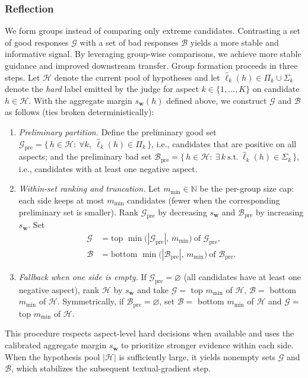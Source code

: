 \documentclass[letterpaper]{article} %
\begin{document}
\subsubsection{Reflection}
We form groups instead of comparing only extreme candidates. Contrasting a set of good responses \(\mathcal{G}\) with a set of bad responses \(\mathcal{B}\) yields a more stable and informative signal. By leveraging group-wise comparisons, we achieve more stable guidance and improved downstream transfer.
Group formation proceeds in three steps. Let \(\mathcal{H}\) denote the current pool of hypotheses and let \(\hat\ell_k(h)\in \Pi_k\cup\Sigma_k\) denote the \emph{hard} label emitted by the judge for aspect \(k\in\{1,\dots,K\}\) on candidate \(h\in\mathcal{H}\). With the aggregate margin \(s_{\mathbf w}(h)\) defined above, we construct \(\mathcal{G}\) and \(\mathcal{B}\) as follows (ties broken deterministically):
\begin{enumerate}
  \item \emph{Preliminary partition.} Define the preliminary good set
  \(\mathcal{G}_{\text{pre}}=\{\,h\in\mathcal{H}:\ \forall k,\ \hat\ell_k(h)\in \Pi_k\,\}\),
  i.e., candidates that are positive on all aspects; and the preliminary bad set
  \(\mathcal{B}_{\text{pre}}=\{\,h\in\mathcal{H}:\ \exists\,k\ \text{s.t.}\ \hat\ell_k(h)\in \Sigma_k\,\}\),
  i.e., candidates with at least one negative aspect.
  \item \emph{Within-set ranking and truncation.} Let \(m_{\min}\in\mathbb{N}\) be the per-group size cap: each side keeps at most \(m_{\min}\) candidates (fewer when the corresponding preliminary set is smaller). Rank \(\mathcal{G}_{\text{pre}}\) by decreasing \(s_{\mathbf w}\) and \(\mathcal{B}_{\text{pre}}\) by increasing \(s_{\mathbf w}\). Set
  \[
  \begin{aligned}
    \mathcal{G} &= \text{top }\min\!\bigl(|\mathcal{G}_{\text{pre}}|,\,m_{\min}\bigr)\ \text{of }\mathcal{G}_{\text{pre}},\\
    \mathcal{B} &= \text{bottom }\min\!\bigl(|\mathcal{B}_{\text{pre}}|,\,m_{\min}\bigr)\ \text{of }\mathcal{B}_{\text{pre}}.
  \end{aligned}
  \]
  \item \emph{Fallback when one side is empty.} If \(\mathcal{G}_{\text{pre}}=\varnothing\) (all candidates have at least one negative aspect), rank \(\mathcal{H}\) by \(s_{\mathbf w}\) and take
  \(\mathcal{G}=\) top \(m_{\min}\) of \(\mathcal{H}\), \(\mathcal{B}=\) bottom \(m_{\min}\) of \(\mathcal{H}\).
  Symmetrically, if \(\mathcal{B}_{\text{pre}}=\varnothing\), set \(\mathcal{B}=\) bottom \(m_{\min}\) of \(\mathcal{H}\) and \(\mathcal{G}=\) top \(m_{\min}\) of \(\mathcal{H}\).
\end{enumerate}
This procedure respects aspect-level hard decisions when available and uses the calibrated aggregate margin \(s_{\mathbf w}\) to prioritize stronger evidence within each side. When the hypothesis pool $|\mathcal{H}|$ is sufficiently large, it yields nonempty sets $\mathcal{G}$ and $\mathcal{B}$, which stabilizes the subsequent textual-gradient step.
\end{document}
